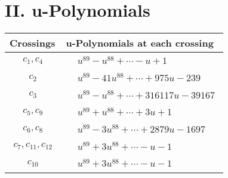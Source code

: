 \documentclass[1p]{elsarticle_modified}
\theoremstyle{definition}
\begin{document}
\newpage\renewcommand{\arraystretch}{1}
\centering \section*{ II. u-Polynomials}
\begin{tabular}{m{50pt}|m{274pt}}
Crossings & \hspace{64pt}u-Polynomials at each crossing \\
\hline $$\begin{aligned}c_{1},c_{4}\end{aligned}$$&$\begin{aligned}
&u^{89}- u^{88}+\cdots- u+1
\end{aligned}$\\
\hline $$\begin{aligned}c_{2}\end{aligned}$$&$\begin{aligned}
&u^{89}-41 u^{88}+\cdots+975 u-239
\end{aligned}$\\
\hline $$\begin{aligned}c_{3}\end{aligned}$$&$\begin{aligned}
&u^{89}- u^{88}+\cdots+316117 u-39167
\end{aligned}$\\
\hline $$\begin{aligned}c_{5},c_{9}\end{aligned}$$&$\begin{aligned}
&u^{89}+u^{88}+\cdots+3 u+1
\end{aligned}$\\
\hline $$\begin{aligned}c_{6},c_{8}\end{aligned}$$&$\begin{aligned}
&u^{89}-3 u^{88}+\cdots+2879 u-1697
\end{aligned}$\\
\hline $$\begin{aligned}c_{7},c_{11},c_{12}\end{aligned}$$&$\begin{aligned}
&u^{89}+3 u^{88}+\cdots- u-1
\end{aligned}$\\
\hline $$\begin{aligned}c_{10}\end{aligned}$$&$\begin{aligned}
&u^{89}+3 u^{88}+\cdots- u-1
\end{aligned}$\\
\hline
\end{tabular}\newpage\renewcommand{\arraystretch}{1}
\end{document}
